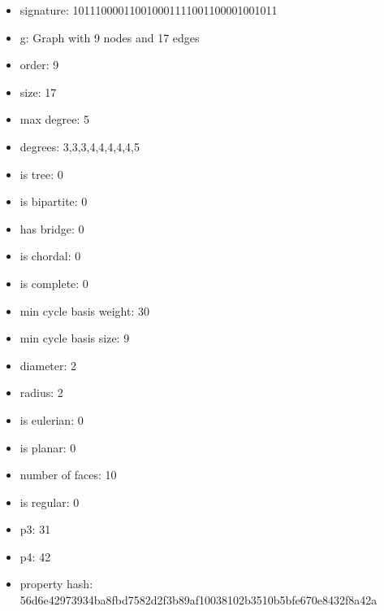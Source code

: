 \newpage
\begin{figure}
\end{figure}
\begin{itemize}
\item signature: 101110000110010001111001100001001011
\item g: Graph with 9 nodes and 17 edges
\item order: 9
\item size: 17
\item max degree: 5
\item degrees: 3,3,3,4,4,4,4,4,5
\item is tree: 0
\item is bipartite: 0
\item has bridge: 0
\item is chordal: 0
\item is complete: 0
\item min cycle basis weight: 30
\item min cycle basis size: 9
\item diameter: 2
\item radius: 2
\item is eulerian: 0
\item is planar: 0
\item number of faces: 10
\item is regular: 0
\item p3: 31
\item p4: 42
\item property hash: 56d6e42973934ba8fbd7582d2f3b89af10038102b3510b5bfe670e8432f8a42a
\end{itemize}
